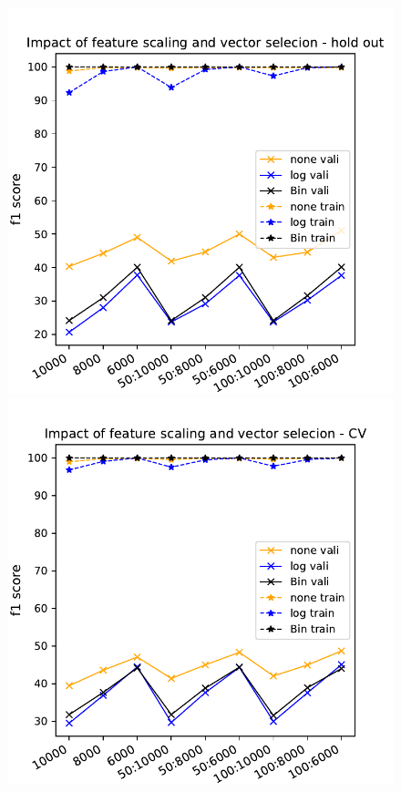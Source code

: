 \documentclass[11pt]{article}
\begin{document}
\begin{figure}[h]
\begin{minipage}[t]{0.33\textwidth}
\includegraphics[width=1\linewidth]{amazon/NB_scaling_vect_selection_HO.pdf}
\end{minipage}
\begin{minipage}[t]{0.33\textwidth}
\includegraphics[width=1\linewidth]{amazon/NB_scaling_vect_selection_CV.pdf}

\end{minipage}
\end{figure}
\end{document}
